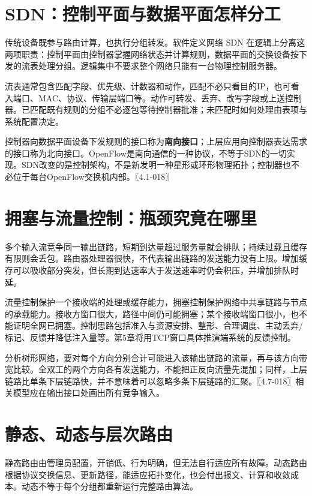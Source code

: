 \section{SDN：控制平面与数据平面怎样分工}\label{CN04-02}

传统设备既参与路由计算，也执行分组转发。软件定义网络 SDN 在逻辑上分离这两项职责：控制平面由控制器掌握网络状态并计算规则，数据平面的交换设备按下发的流表处理分组。逻辑集中不要求整个网络只能有一台物理控制服务器。

流表通常包含匹配字段、优先级、计数器和动作，匹配不必只看目的IP，也可看入端口、MAC、协议、传输层端口等。动作可转发、丢弃、改写字段或上送控制器。已匹配既有规则的分组不必逐包等待控制器批准；未匹配时如何处理由表项与系统配置决定。

控制器向数据平面设备下发规则的接口称为\textbf{南向接口}；上层应用向控制器表达需求的接口称为北向接口。OpenFlow是南向通信的一种协议，不等于SDN的一切实现。SDN改变的是控制架构，不是新发明一种星形或环形物理拓扑；控制器也不必位于每台OpenFlow交换机内部。〖4.1-018〗

\section{拥塞与流量控制：瓶颈究竟在哪里}\label{CN04-03}

多个输入流竞争同一输出链路，短期到达量超过服务量就会排队；持续过载且缓存有限则会丢包。路由器处理器很快，不代表输出链路的发送能力没有上限。增加缓存可以吸收部分突发，但长期到达速率大于发送速率时仍会积压，并增加排队时延。

流量控制保护一个接收端的处理或缓存能力，拥塞控制保护网络中共享链路与节点的承载能力。接收方窗口很大，路径中间仍可能拥塞；某个接收端窗口很小，也不能证明全网已拥塞。控制思路包括准入与资源安排、整形、合理调度、主动丢弃/标记、反馈并降低注入量等。第5章将用TCP窗口具体推演端系统的反馈控制。

分析树形网络，要对每个方向分别合计可能进入该输出链路的流量，再与该方向带宽比较。全双工的两个方向各有发送能力，不能把正反向流量先混加；同样，上层链路比单条下层链路快，并不意味着可以忽略多条下层链路的汇聚。〖4.7-018〗相关模型应在输出接口处画出所有竞争输入。

\section{静态、动态与层次路由}\label{CN04-04}

静态路由由管理员配置，开销低、行为明确，但无法自行适应所有故障。动态路由根据协议交换信息、更新路径，能适应拓扑变化，也会付出报文、计算和收敛成本。动态不等于每个分组都重新运行完整路由算法。

